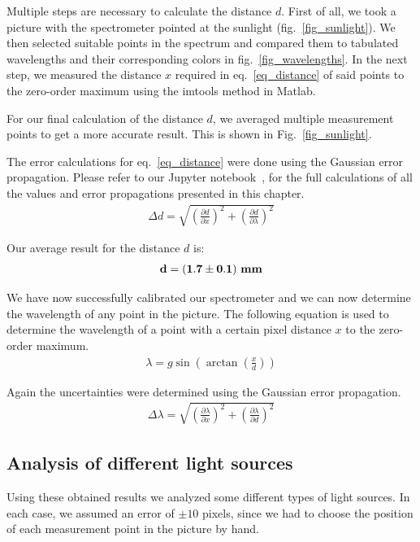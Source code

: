 Multiple steps are necessary to calculate the distance $d$.
First of all, we took a picture with the spectrometer pointed at the sunlight (fig.~\ref{fig_sunlight}). We then selected suitable 
points in the spectrum and compared them to tabulated wavelengths and their corresponding colors 
in fig.~\ref{fig_wavelengths}. In the next step, we measured the distance $x$ required in eq.~\ref{eq_distance} of said points to the zero-order maximum
using the imtools method in Matlab.

For our final calculation of the distance $d$, we averaged multiple measurement points to get a more
accurate result. This is shown in Fig.~\ref{fig_sunlight}.

The error calculations for eq.~\ref{eq_distance} were done using the Gaussian error propagation.
Please refer to our Jupyter notebook~\cite{GitHub}, for the full calculations of all the values and 
error propagations presented in this chapter. 
\begin{align}
    \Delta d = \sqrt{{\left(\frac{\partial d}{\partial x}\right)}^2 + {\left(\frac{\partial d}{\partial \lambda}\right)}^2}
\end{align}

Our average result for the distance $d$ is:
\begin{align}
    \bf d = (1.7 \pm 0.1) ~\si{\bf\milli\meter} \label{res_d}
\end{align}

We have now successfully calibrated our spectrometer and we can now determine the wavelength
of any point in the picture.
The following equation is used to determine the wavelength of a point with a certain pixel 
distance $x$ to the zero-order maximum.
\begin{align}
    \lambda = g \sin\left(\arctan\left(\frac{x}{d}\right)\right) \label{eq_lambda}
\end{align}

Again the uncertainties were determined using the Gaussian error propagation.
\begin{align}
    \Delta \lambda = \sqrt{{\left(\frac{\partial \lambda}{\partial x}\right)}^2 + {\left(\frac{\partial \lambda}{\partial d}\right)}^2}
\end{align}

\subsection{Analysis of different light sources}

Using these obtained results we analyzed some different types of light sources. In each case, we assumed 
an error of $\pm 10$ pixels, since we had to choose the position of each measurement point in the picture by hand.

